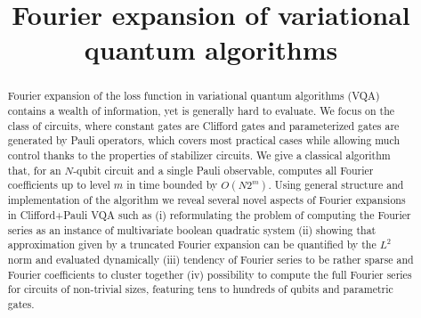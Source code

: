 \documentclass[twocolumn, amsfonts, amssymb, aps, nofootinbib]{revtex4-2}
\newcommand{\CP}{Clifford+Pauli}
\begin{document}
\title{Fourier expansion of variational quantum algorithms}


\begin{abstract}
Fourier expansion of the loss function in variational quantum algorithms (VQA) contains a wealth of information, yet is generally hard to evaluate. We focus on the class of circuits, where constant gates are Clifford gates and parameterized gates are generated by Pauli operators, which covers most practical cases while allowing much control thanks to the properties of stabilizer circuits. We give a classical algorithm that, for an $N$-qubit circuit and a single Pauli observable, computes all Fourier coefficients up to level $m$ in time bounded by $O(N2^m)$. Using general structure and implementation of the algorithm we reveal several novel aspects of Fourier expansions in \CP{} VQA such as (i) reformulating the problem of computing the Fourier series as an instance of multivariate boolean quadratic system (ii) showing that approximation given by a truncated Fourier expansion can be quantified by the $L^2$ norm and evaluated dynamically (iii) tendency of Fourier series to be rather sparse and Fourier coefficients to cluster together (iv) possibility to compute the full Fourier series for circuits of non-trivial sizes, featuring tens to hundreds of qubits and parametric gates.

\end{abstract}

\maketitle

\tableofcontents
\end{document}
